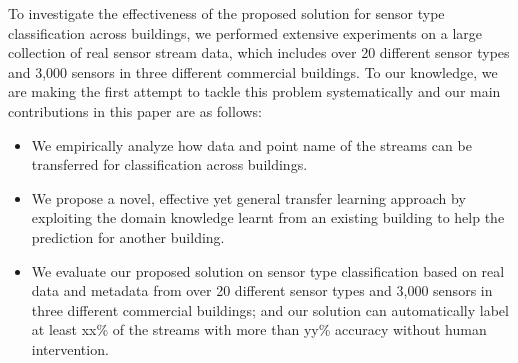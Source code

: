 To investigate the effectiveness of the proposed solution for sensor type 
classification across buildings, we performed extensive experiments on a large 
collection of real sensor stream data, which includes over 20 different sensor types 
and 3,000 sensors in three different commercial buildings. To our knowledge, we are 
making the first attempt to tackle this problem systematically and our main 
contributions in this paper are as follows:

\begin{itemize}\itemsep1pt \parskip1pt 
\item We empirically analyze how data and point name of the streams can be transferred for classification across buildings.
\item We propose a novel, effective yet general transfer learning approach by exploiting the domain knowledge learnt from an existing building to help the prediction for another building.
\item We evaluate our proposed solution on sensor type classification based on real data and metadata from over 20 different sensor types and 3,000 sensors in three different commercial buildings; and our solution can automatically label at least xx\% of the streams with more than yy\% accuracy without human intervention.
\end{itemize}
